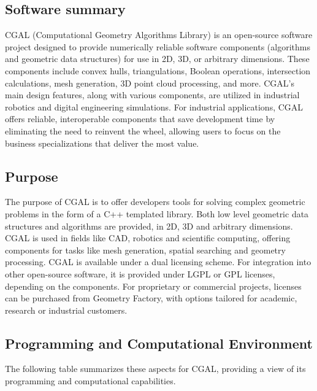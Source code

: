 \subsection{Software summary}
\label{sec:CGAL:summary}

CGAL (Computational Geometry Algorithms Library) \cite{the_cgal_project_cgal_2024} is an open-source software project designed to provide
numerically reliable software components (algorithms and geometric data structures) for use in 2D, 3D, or arbitrary dimensions.
These components include convex hulls, triangulations, Boolean operations, intersection calculations, mesh generation,
3D point cloud processing, and more. CGAL’s main design features, along with various components, are utilized in industrial
robotics and digital engineering simulations. For industrial applications, CGAL offers reliable, interoperable components
that save development time by eliminating the need to reinvent the wheel, allowing users to focus on the business specializations
that deliver the most value.




\subsection{Purpose}
\label{sec:CGAL:purpose}

The purpose of CGAL is to offer developers tools for solving complex geometric problems in the form of a C++ templated library. Both low level geometric data structures and algorithms are provided, in 2D, 3D and arbitrary dimensions.
CGAL is used in fields like CAD, robotics and scientific computing, offering components for tasks like mesh generation, spatial searching and geometry processing. CGAL is available under a dual licensing scheme. For integration into other open-source software,
it is provided under LGPL or GPL licenses, depending on the components. For proprietary or commercial projects,
licenses can be purchased from Geometry Factory, with options tailored for academic, research or industrial customers.

\subsection{Programming and Computational Environment}
\label{sec::CGAL:environment_capabilities}

The following table summarizes these aspects for CGAL, providing a  view of its programming and computational capabilities.

